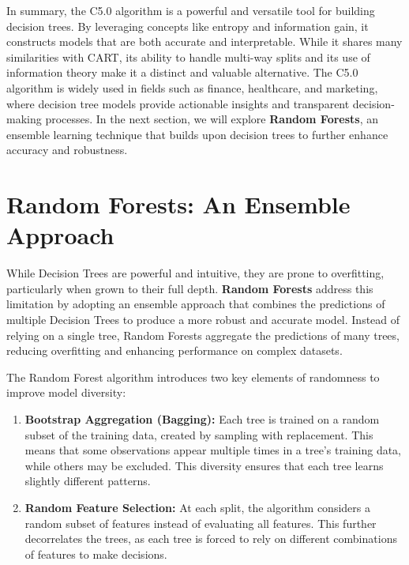 \documentclass[
]{book}
\providecommand{\tightlist}{%
  \setlength{\itemsep}{0pt}\setlength{\parskip}{0pt}}
\theoremstyle{definition}
\theoremstyle{definition}
\theoremstyle{definition}
\theoremstyle{definition}
\theoremstyle{remark}
\begin{document}
In summary, the C5.0 algorithm is a powerful and versatile tool for building decision trees. By leveraging concepts like entropy and information gain, it constructs models that are both accurate and interpretable. While it shares many similarities with CART, its ability to handle multi-way splits and its use of information theory make it a distinct and valuable alternative. The C5.0 algorithm is widely used in fields such as finance, healthcare, and marketing, where decision tree models provide actionable insights and transparent decision-making processes. In the next section, we will explore \textbf{Random Forests}, an ensemble learning technique that builds upon decision trees to further enhance accuracy and robustness.

\section{Random Forests: An Ensemble Approach}\label{random-forests-an-ensemble-approach}

While Decision Trees are powerful and intuitive, they are prone to overfitting, particularly when grown to their full depth. \textbf{Random Forests} \citep{breiman2001random} address this limitation by adopting an ensemble approach that combines the predictions of multiple Decision Trees to produce a more robust and accurate model. Instead of relying on a single tree, Random Forests aggregate the predictions of many trees, reducing overfitting and enhancing performance on complex datasets.

The Random Forest algorithm introduces two key elements of randomness to improve model diversity:

\begin{enumerate}
\def\labelenumi{\arabic{enumi}.}
\tightlist
\item
  \textbf{Bootstrap Aggregation (Bagging):} Each tree is trained on a random subset of the training data, created by sampling with replacement. This means that some observations appear multiple times in a tree's training data, while others may be excluded. This diversity ensures that each tree learns slightly different patterns.\\
\item
  \textbf{Random Feature Selection:} At each split, the algorithm considers a random subset of features instead of evaluating all features. This further decorrelates the trees, as each tree is forced to rely on different combinations of features to make decisions.
\end{enumerate}
\end{document}

